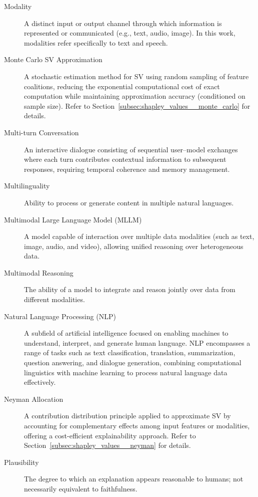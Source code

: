 \begin{description}
    \item[Modality] A distinct input or output channel through which information is represented or communicated (e.g., text, audio, image). In this work, modalities refer specifically to text and speech.

    \item[Monte Carlo SV Approximation] A stochastic estimation method for SV using random sampling of feature coalitions, reducing the exponential computational cost of exact computation while maintaining approximation accuracy (conditioned on sample size). Refer to Section~\ref{subsec:shapley_values__monte_carlo} for details.

    \item[Multi-turn Conversation] An interactive dialogue consisting of sequential user–model exchanges where each turn contributes contextual information to subsequent responses, requiring temporal coherence and memory management.

    \item[Multilinguality] Ability to process or generate content in multiple natural languages.

    \item[Multimodal Large Language Model (MLLM)] A model capable of interaction over multiple data modalities (such as text, image, audio, and video), allowing unified reasoning over heterogeneous data.

    \item[Multimodal Reasoning] The ability of a model to integrate and reason jointly over data from different modalities.

    \item[Natural Language Processing (NLP)] A subfield of artificial intelligence focused on enabling machines to understand, interpret, and generate human language. NLP encompasses a range of tasks such as text classification, translation, summarization, question answering, and dialogue generation, combining computational linguistics with machine learning to process natural language data effectively.

    \item[Neyman Allocation] A contribution distribution principle applied to approximate SV by accounting for complementary effects among input features or modalities, offering a cost-efficient explainability approach. Refer to Section~\ref{subsec:shapley_values__neyman} for details.

    \item[Plausibility] The degree to which an explanation appears reasonable to humans; not necessarily equivalent to faithfulness.


\end{description}

